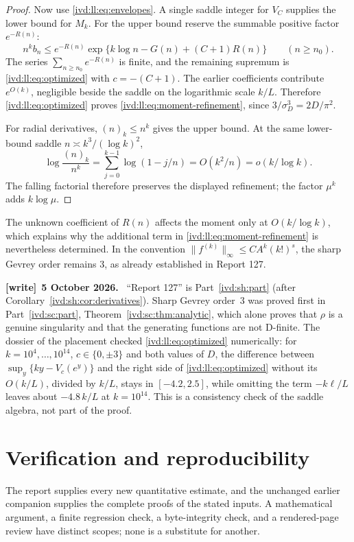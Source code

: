 \documentclass[11pt,letterpaper]{article}
\theoremstyle{remark}\newtheorem{remark}[theorem]{Remark}
\numberwithin{equation}{section}
\newenvironment{writenote}[1][]{\par\smallskip\begingroup\small
 \noindent\textbf{[write]}\if\relax\detokenize{#1}\relax\else~\textbf{#1.}\fi\ }%
 {\par\endgroup\smallskip}
\begin{document}
\begin{proof}
Now use \eqref{ivd:ll:eq:envelopes}. A single saddle integer for
$V_C$ supplies the lower bound for $M_k$.
For the upper bound reserve the summable positive factor $e^{-R(n)}$:
\[
 n^k b_n\le e^{-R(n)}
       \exp\{k\log n-G(n)+(C+1)R(n)\}
       \qquad(n\ge n_0).
\]
The series $\sum_{n\ge n_0}e^{-R(n)}$ is finite, and the remaining
supremum is \eqref{ivd:ll:eq:optimized} with $c=-(C+1)$.
The earlier coefficients contribute $e^{O(k)}$, negligible beside
the saddle on the logarithmic scale $k/L$. Therefore
\eqref{ivd:ll:eq:optimized} proves \eqref{ivd:ll:eq:moment-refinement}, since
$3/\sigma_D^3=2D/\pi^2$.

For radial derivatives, $(n)_k\le n^k$ gives the upper bound.
At the same lower-bound saddle $n\asymp k^3/(\log k)^2$,
\[
 \log\frac{(n)_k}{n^k}
 =\sum_{j=0}^{k-1}\log(1-j/n)=O(k^2/n)=o(k/\log k).
\]
The falling factorial therefore preserves the displayed refinement;
the factor $\mu^k$ adds $k\log\mu$.
\end{proof}
The unknown coefficient of $R(n)$ affects the moment only at
$O(k/\log k)$, which explains why the additional term in
\eqref{ivd:ll:eq:moment-refinement} is nevertheless determined. In the
convention $\|f^{(k)}\|_\infty\le C A^k(k!)^s$, the sharp
Gevrey order remains $3$, as already established in Report 127.
\begin{writenote}[5 October 2026]
``Report 127'' is Part~\ref{ivd:sh:part} (after Corollary~\ref{ivd:sh:cor:derivatives}). Sharp Gevrey order~$3$ was proved first in Part~\ref{ivd:sc:part}, Theorem~\ref{ivd:sc:thm:analytic}, which alone proves that $\rho$ is a genuine singularity and that the generating functions are not D-finite. The dossier of the placement checked \eqref{ivd:ll:eq:optimized} numerically: for $k=10^4,\ldots,10^{14}$, $c\in\{0,\pm3\}$ and both values of $D$, the difference between $\sup_y\{ky-V_c(e^y)\}$ and the right side of \eqref{ivd:ll:eq:optimized} without its $O(k/L)$, divided by $k/L$, stays in $[-4.2,2.5]$, while omitting the term $-k\ell/L$ leaves about $-4.8\,k/L$ at $k=10^{14}$. This is a consistency check of the saddle algebra, not part of the proof.
\end{writenote}

\section{Verification and reproducibility}\label{ivd:ll:sec:verification}
The report supplies every new quantitative estimate, and the unchanged
earlier companion supplies the complete proofs of the stated inputs.
A mathematical argument, a finite regression check, a byte-integrity
check, and a rendered-page review have distinct scopes; none is a
substitute for another.
\end{document}
